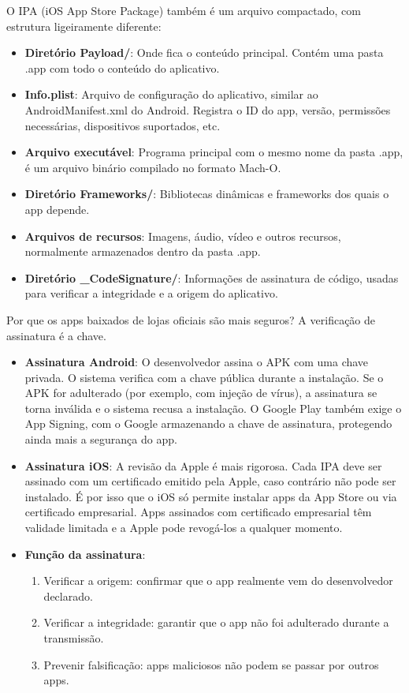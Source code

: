 
O IPA (iOS App Store Package) também é um arquivo compactado, com estrutura ligeiramente diferente:

\begin{itemize}
  \item \textbf{Diretório Payload/}: Onde fica o conteúdo principal. Contém uma pasta .app com todo o conteúdo do aplicativo.
  \item \textbf{Info.plist}: Arquivo de configuração do aplicativo, similar ao AndroidManifest.xml do Android. Registra o ID do app, versão, permissões necessárias, dispositivos suportados, etc.
  \item \textbf{Arquivo executável}: Programa principal com o mesmo nome da pasta .app, é um arquivo binário compilado no formato Mach-O.
  \item \textbf{Diretório Frameworks/}: Bibliotecas dinâmicas e frameworks dos quais o app depende.
  \item \textbf{Arquivos de recursos}: Imagens, áudio, vídeo e outros recursos, normalmente armazenados dentro da pasta .app.
  \item \textbf{Diretório \_CodeSignature/}: Informações de assinatura de código, usadas para verificar a integridade e a origem do aplicativo.
\end{itemize}


Por que os apps baixados de lojas oficiais são mais seguros? A verificação de assinatura é a chave.

\begin{itemize}
  \item \textbf{Assinatura Android}: O desenvolvedor assina o APK com uma chave privada. O sistema verifica com a chave pública durante a instalação. Se o APK for adulterado (por exemplo, com injeção de vírus), a assinatura se torna inválida e o sistema recusa a instalação. O Google Play também exige o App Signing, com o Google armazenando a chave de assinatura, protegendo ainda mais a segurança do app.
  \item \textbf{Assinatura iOS}: A revisão da Apple é mais rigorosa. Cada IPA deve ser assinado com um certificado emitido pela Apple, caso contrário não pode ser instalado. É por isso que o iOS só permite instalar apps da App Store ou via certificado empresarial. Apps assinados com certificado empresarial têm validade limitada e a Apple pode revogá-los a qualquer momento.
  \item \textbf{Função da assinatura}:
  \begin{enumerate}
    \item Verificar a origem: confirmar que o app realmente vem do desenvolvedor declarado.
    \item Verificar a integridade: garantir que o app não foi adulterado durante a transmissão.
    \item Prevenir falsificação: apps maliciosos não podem se passar por outros apps.
  \end{enumerate}
\end{itemize}

